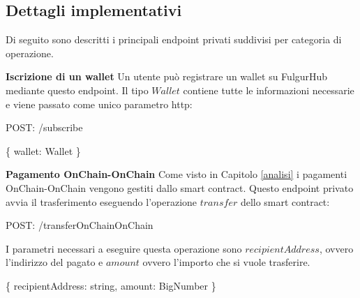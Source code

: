 \documentclass[12pt,italian,]{book}
\newenvironment{Shaded}{}{}
\newcommand{\DataTypeTok}[1]{\textcolor[rgb]{0.56,0.13,0.00}{#1}}
\newcommand{\NormalTok}[1]{#1}
\newcommand{\OperatorTok}[1]{\textcolor[rgb]{0.40,0.40,0.40}{#1}}
\newcommand{\SpecialStringTok}[1]{\textcolor[rgb]{0.73,0.40,0.53}{#1}}
\begin{document}
\hypertarget{dettagli-implementativi-1}{%
\subsection{Dettagli implementativi}\label{dettagli-implementativi-1}}

Di seguito sono descritti i principali endpoint privati suddivisi per categoria di operazione.

\textbf{\textbf{Iscrizione di un wallet}} Un utente può registrare un wallet su FulgurHub mediante questo endpoint. Il tipo \(Wallet\) contiene tutte le informazioni necessarie e viene passato come unico parametro http:

\begin{Shaded}
\begin{Highlighting}[]
\NormalTok{POST}\OperatorTok{:} \SpecialStringTok{/subscribe}
\end{Highlighting}
\end{Shaded}

\begin{Shaded}
\begin{Highlighting}[]
\OperatorTok{\{}
  \DataTypeTok{wallet}\OperatorTok{:}\NormalTok{ Wallet}
\OperatorTok{\}}
\end{Highlighting}
\end{Shaded}

\textbf{\textbf{Pagamento OnChain-OnChain}} Come visto in Capitolo \ref{analisi} i pagamenti OnChain-OnChain vengono gestiti dallo smart contract. Questo endpoint privato avvia il trasferimento eseguendo l'operazione \(transfer\) dello smart contract:

\begin{Shaded}
\begin{Highlighting}[]
\NormalTok{POST}\OperatorTok{:} \SpecialStringTok{/transferOnChainOnChain}
\end{Highlighting}
\end{Shaded}

I parametri necessari a eseguire questa operazione sono \(recipientAddress\), ovvero l'indirizzo del pagato e \(amount\) ovvero l'importo che si vuole trasferire.

\begin{Shaded}
\begin{Highlighting}[]
\OperatorTok{\{}
    \DataTypeTok{recipientAddress}\OperatorTok{:}\NormalTok{ string}\OperatorTok{,}
    \DataTypeTok{amount}\OperatorTok{:}\NormalTok{ BigNumber}
\OperatorTok{\}}
\end{Highlighting}
\end{Shaded}
\end{document}

